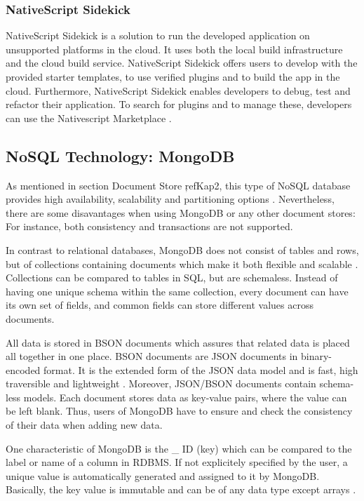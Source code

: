 \subsubsection{NativeScript Sidekick}\label{Native}

NativeScript Sidekick is a solution to run the developed application on unsupported platforms in the cloud. It uses both the local build infrastructure and the cloud build service. NativeScript Sidekick offers users to develop with the provided starter templates, to use verified plugins and to build the app in the cloud. Furthermore, NativeScript Sidekick enables developers to debug, test and refactor their application. 
To search for plugins and to manage these, developers can use the Nativescript Marketplace \cite{nsmarket}.

\subsection{NoSQL Technology: MongoDB}\label{mongodb}

As mentioned in section Document Store \c ref{Kap2}, this type of NoSQL database provides high availability, scalability and partitioning options \cite[p.25 ff.]{mongodb_edward}. Nevertheless, there are some disavantages when using MongoDB or any other document stores: For instance, both consistency and transactions are not supported. 

In contrast to relational databases, MongoDB does not consist of tables and rows, but of collections containing documents which make it both flexible and scalable \cite[p.25 ff.]{mongodb_edward}. Collections can be compared to tables in SQL, but are schemaless. Instead of having one unique schema within the same collection, every document can have its own set of fields, and common fields can store different values across documents.  

All data is stored in \ac{BSON} documents which assures that related data is placed all together in one place. BSON documents are JSON documents in binary-encoded format. It is the extended form of the JSON data model and is fast, high traversible and lightweight \cite[p.31 ff.]{mongodb_edward}. Moreover, JSON/BSON documents contain schema-less models. Each document stores data as key-value pairs, where the value can be left blank. Thus, users of MongoDB have to ensure and check the consistency of their data when adding new data.

One characteristic of MongoDB is the {\_} ID (key) which can be compared to the label or name of a column in RDBMS. If not explicitely specified by the user, a unique value is automatically generated and assigned to it by MongoDB. Basically, the key value is immutable and can be of any data type except arrays \cite[p.31 ff.]{mongodb_edward}.


